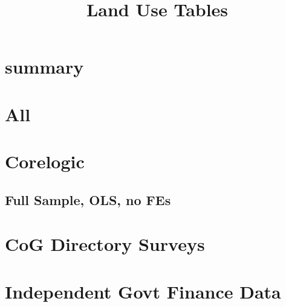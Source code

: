 \documentclass{article}
\title{Land Use Tables}
\begin{document}
\maketitle
\tableofcontents
{\footnotesize 
\listoffigures
\listoftables}
\clearpage


\section{summary}

\begin{table}[htbp]
\footnotesize
\centering {} 

 \label{tab:muni_outcomes_rf}
 \end{table}
\begin{landscape}

\section{All}

\clearpage

\clearpage


\clearpage

\clearpage



\clearpage

\clearpage

\section{Corelogic}
\subsection{Full Sample, OLS, no FEs}

\clearpage

\clearpage

\section{CoG Directory Surveys}

\clearpage

\clearpage

\section{Independent Govt Finance Data}

\clearpage

\clearpage

\end{landscape}
\end{document}
